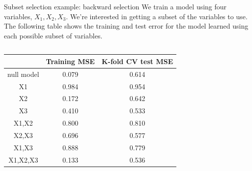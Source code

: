 \documentclass[aspectratio=169,usenames,dvipsnames]{beamer}
\begin{document}
\begin{frame}[t]{Subset selection example: backward selection}
	We train a model using four variables, $X_1,X_2,X_3$.
	We're interested in getting a subset of the variables to use. The following table shows the training and test error for the model learned using each possible subset of variables.
	\begin{columns}
	\centering
	\begin{center}
	\begin{tabular}{c | c | c}
			& Training MSE & K-fold CV test MSE\\
		\hline
		null model & 0.079 &	0.614\\
		\hline
		X1 &0.984	&0.954 \\
		\hline
		X2&0.172	&0.642\\
		\hline
		X3&0.410	&0.533\\
		\hline
		X1,X2&0.800	&0.810\\
		\hline
		X2,X3&0.696	&0.577\\
		\hline
		X1,X3&0.888	&0.779\\
		\hline
		X1,X2,X3&0.133	&0.536\\
		\hline
	\end{tabular}
	\end{center}
	
	\centering

	
	\end{columns}
	\end{frame}
\end{document}
